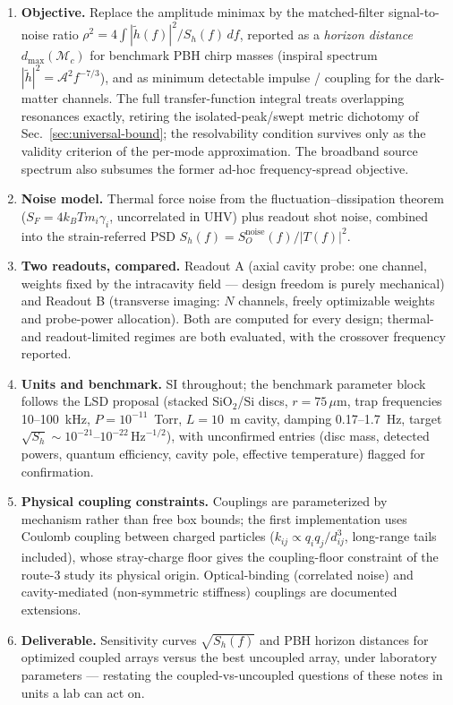 \documentclass[11pt, letterpaper]{article}
\begin{document}
\begin{enumerate}[noitemsep]
  \item \textbf{Objective.}  Replace the amplitude minimax by the
        matched-filter signal-to-noise ratio
        $\rho^2 = 4\int |\tilde h(f)|^2 / S_h(f)\, df$, reported as a
        \emph{horizon distance} $d_{\max}(\mathcal{M}_c)$ for benchmark PBH
        chirp masses (inspiral spectrum
        $|\tilde h|^2 = \mathcal{A}^2 f^{-7/3}$), and as minimum detectable
        impulse / coupling for the dark-matter channels.  The full
        transfer-function integral treats overlapping resonances exactly,
        retiring the isolated-peak/swept metric dichotomy of
        Sec.~\ref{sec:universal-bound}; the resolvability condition survives
        only as the validity criterion of the per-mode approximation.  The
        broadband source spectrum also subsumes the former ad-hoc
        frequency-spread objective.
  \item \textbf{Noise model.}  Thermal force noise from the
        fluctuation--dissipation theorem
        ($S_F = 4k_BT m_i\gamma_i$, uncorrelated in UHV) plus readout shot
        noise, combined into the strain-referred PSD
        $S_h(f) = S_O^{\mathrm{noise}}(f)/|T(f)|^2$.
  \item \textbf{Two readouts, compared.}  Readout A (axial cavity probe:
        one channel, weights fixed by the intracavity field --- design
        freedom is purely mechanical) and Readout B (transverse imaging:
        $N$ channels, freely optimizable weights and probe-power
        allocation).  Both are computed for every design; thermal- and
        readout-limited regimes are both evaluated, with the crossover
        frequency reported.
  \item \textbf{Units and benchmark.}  SI throughout; the benchmark
        parameter block follows the LSD proposal (stacked SiO$_2$/Si discs,
        $r = 75\,\mu$m, trap frequencies 10--100~kHz,
        $P = 10^{-11}$~Torr, $L = 10$~m cavity, damping
        0.17--1.7~Hz, target $\sqrt{S_h}\sim 10^{-21}$--$10^{-22}\,
        \mathrm{Hz}^{-1/2}$), with unconfirmed entries (disc mass, detected
        powers, quantum efficiency, cavity pole, effective temperature)
        flagged for confirmation.
  \item \textbf{Physical coupling constraints.}  Couplings are
        parameterized by mechanism rather than free box bounds; the first
        implementation uses Coulomb coupling between charged particles
        ($k_{ij} \propto q_i q_j / d_{ij}^3$, long-range tails included),
        whose stray-charge floor gives the coupling-floor constraint of the
        route-3 study its physical origin.  Optical-binding (correlated
        noise) and cavity-mediated (non-symmetric stiffness) couplings are
        documented extensions.
  \item \textbf{Deliverable.}  Sensitivity curves $\sqrt{S_h(f)}$ and PBH
        horizon distances for optimized coupled arrays versus the best
        uncoupled array, under laboratory parameters --- restating the
        coupled-vs-uncoupled questions of these notes in units a lab can
        act on.
\end{enumerate}
\end{document}
